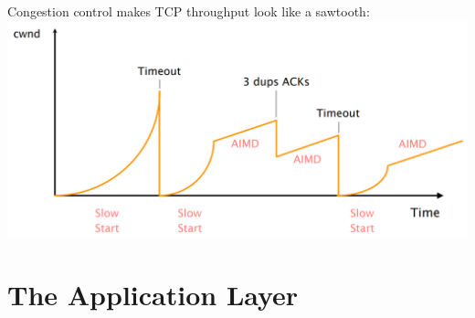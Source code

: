 \documentclass[a4paper, fontsize=8pt, landscape, DIV=1]{scrartcl}
\begin{document}
\begin{multicols*}{4}
\begin{center}
		\end{center}
		\vspace{0.1cm}
		Congestion control makes TCP throughput look like a sawtooth:\\
		\includegraphics[width=\columnwidth]{images/Transport_Layer/tcp_throughput.png}
		\par 
		
		\section{The Application Layer}

\end{multicols*}
\end{document}
